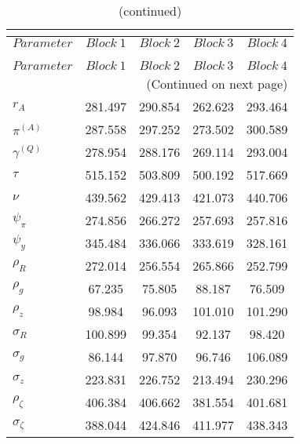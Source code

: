  
\begin{center}
\begin{longtable}{lcccc} 
\caption{MCMC Inefficiency factors per block}\\
 \label{Table:MCMC_inefficiency_factors}\\
\toprule 
$Parameter         $	 & 	 $     Block~1$	 & 	 $     Block~2$	 & 	 $     Block~3$	 & 	 $     Block~4$\\
\midrule \endfirsthead 
\caption{(continued)}\\
 \toprule \\ 
$Parameter         $	 & 	 $     Block~1$	 & 	 $     Block~2$	 & 	 $     Block~3$	 & 	 $     Block~4$\\
\midrule \endhead 
\midrule \multicolumn{5}{r}{(Continued on next page)} \\ \bottomrule \endfoot 
\bottomrule \endlastfoot 
$ {r_{A}}          $	 & 	     281.497	 & 	     290.854	 & 	     262.623	 & 	     293.464 \\ 
$ {\pi^{(A)}}      $	 & 	     287.558	 & 	     297.252	 & 	     273.502	 & 	     300.589 \\ 
$ {\gamma^{(Q)}}   $	 & 	     278.954	 & 	     288.176	 & 	     269.114	 & 	     293.004 \\ 
$ {\tau}           $	 & 	     515.152	 & 	     503.809	 & 	     500.192	 & 	     517.669 \\ 
$ {\nu}            $	 & 	     439.562	 & 	     429.413	 & 	     421.073	 & 	     440.706 \\ 
$ {\psi_\pi}       $	 & 	     274.856	 & 	     266.272	 & 	     257.693	 & 	     257.816 \\ 
$ {\psi_y}         $	 & 	     345.484	 & 	     336.066	 & 	     333.619	 & 	     328.161 \\ 
$ {\rho_R}         $	 & 	     272.014	 & 	     256.554	 & 	     265.866	 & 	     252.799 \\ 
$ {\rho_{g}}       $	 & 	      67.235	 & 	      75.805	 & 	      88.187	 & 	      76.509 \\ 
$ {\rho_z}         $	 & 	      98.984	 & 	      96.093	 & 	     101.010	 & 	     101.290 \\ 
$ {\sigma_R}       $	 & 	     100.899	 & 	      99.354	 & 	      92.137	 & 	      98.420 \\ 
$ {\sigma_{g}}     $	 & 	      86.144	 & 	      97.870	 & 	      96.746	 & 	     106.089 \\ 
$ {\sigma_z}       $	 & 	     223.831	 & 	     226.752	 & 	     213.494	 & 	     230.296 \\ 
$ {\rho_\zeta}     $	 & 	     406.384	 & 	     406.662	 & 	     381.554	 & 	     401.681 \\ 
$ {\sigma_\zeta}   $	 & 	     388.044	 & 	     424.846	 & 	     411.977	 & 	     438.343 \\ 
\end{longtable}
 \end{center}
